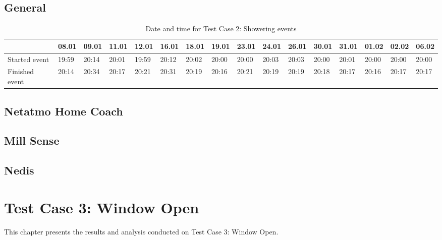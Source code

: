 \subsection{General}
\begin{table}[!hbtp]
    \centering
    \caption{Date and time for Test Case 2: Showering events}
    \begin{adjustbox}{width=1\textwidth} 
        \begin{tabular}{l|l|l|l|l|l|l|l|l|l|l|l|l|l|l|l|}
            \cline{2-16}
                & 08.01 & 09.01 & 11.01 & 12.01 & 16.01 & 18.01 & 19.01 & 23.01 & 24.01 & 26.01 & 30.01 & 31.01 & 01.02 & 02.02 & 06.02 \\ \hline
            \multicolumn{1}{|l|}{Started event}  & 19:59 & 20:14 & 20:01 & 19:59 & 20:12 & 20:02 & 20:00 & 20:00 & 20:03 & 20:03 & 20:00 & 20:01 & 20:00 & 20:00 & 20:00 \\ \hline
            \multicolumn{1}{|l|}{Finished event} & 20:14 & 20:34 & 20:17 & 20:21 & 20:31 & 20:19 & 20:16 & 20:21 & 20:19 & 20:19 & 20:18 & 20:17 & 20:16 & 20:17 & 20:17 \\ \hline
        \end{tabular}
    \end{adjustbox}
    \label{tab:ShoweringDates}
\end{table}

\subsection{Netatmo Home Coach}
\subsection{Mill Sense}
\subsection{Nedis}

\section{Test Case 3: Window Open}
This chapter presents the results and analysis conducted on Test Case 3: Window Open. 
